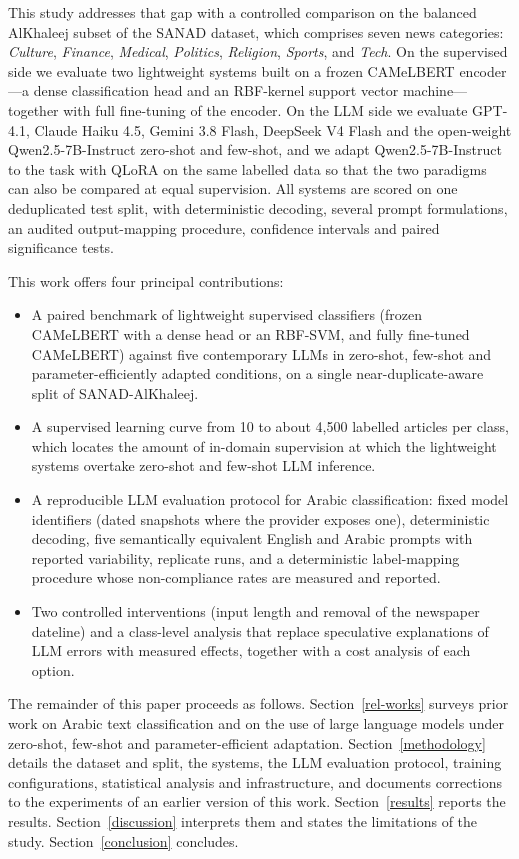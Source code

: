 \documentclass[preprint,12pt,authoryear]{elsarticle}
\newif\ifrevmarkup
\DeclareRobustCommand{\rev}[1]{\ifrevmarkup{\color{blue}#1}\else#1\fi}
\begin{document}
This study addresses that gap with a controlled comparison on the balanced AlKhaleej subset of the SANAD dataset, which comprises seven news categories: \textit{Culture}, \textit{Finance}, \textit{Medical}, \textit{Politics}, \textit{Religion}, \textit{Sports}, and \textit{Tech}. \rev{On the supervised side we evaluate two lightweight systems built on a frozen CAMeLBERT encoder---a dense classification head and an RBF-kernel support vector machine---together with full fine-tuning of the encoder.} \rev{On the LLM side we evaluate GPT-4.1, Claude Haiku 4.5, Gemini 3.8 Flash, DeepSeek V4 Flash and the open-weight Qwen2.5-7B-Instruct zero-shot and few-shot, and we adapt Qwen2.5-7B-Instruct to the task with QLoRA on the same labelled data so that the two paradigms can also be compared at equal supervision.} \rev{All systems are scored on one deduplicated test split, with deterministic decoding, several prompt formulations, an audited output-mapping procedure, confidence intervals and paired significance tests.}

This work offers four principal contributions:
\begin{itemize}
    \item \rev{A paired benchmark of lightweight supervised classifiers (frozen CAMeLBERT with a dense head or an RBF-SVM, and fully fine-tuned CAMeLBERT) against five contemporary LLMs in zero-shot, few-shot and parameter-efficiently adapted conditions, on a single near-duplicate-aware split of SANAD-AlKhaleej.}
    \item \rev{A supervised learning curve from 10 to about 4,500 labelled articles per class, which locates the amount of in-domain supervision at which the lightweight systems overtake zero-shot and few-shot LLM inference.}
    \item \rev{A reproducible LLM evaluation protocol for Arabic classification: fixed model identifiers (dated snapshots where the provider exposes one), deterministic decoding, five semantically equivalent English and Arabic prompts with reported variability, replicate runs, and a deterministic label-mapping procedure whose non-compliance rates are measured and reported.}
    \item \rev{Two controlled interventions (input length and removal of the newspaper dateline) and a class-level analysis that replace speculative explanations of LLM errors with measured effects, together with a cost analysis of each option.}
\end{itemize}

The remainder of this paper proceeds as follows. Section~\ref{rel-works} surveys prior work on Arabic text classification and on the use of large language models under zero-shot, few-shot and parameter-efficient adaptation. Section~\ref{methodology} details the dataset and split, the systems, the LLM evaluation protocol, training configurations, statistical analysis and infrastructure, and documents corrections to the experiments of an earlier version of this work. Section~\ref{results} reports the results. Section~\ref{discussion} interprets them and states the limitations of the study. Section~\ref{conclusion} concludes.
\end{document}
